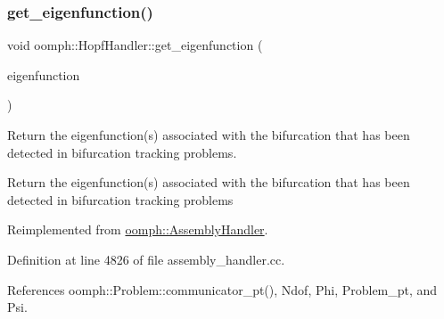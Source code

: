\mbox{\label{classoomph_1_1HopfHandler_a9d1ee586e6274cfa0baa15f82b9fa0ae}} 
\subsubsection{\texorpdfstring{get\+\_\+eigenfunction()}{get\_eigenfunction()}}
{\footnotesize\ttfamily void oomph\+::\+Hopf\+Handler\+::get\+\_\+eigenfunction (\begin{DoxyParamCaption}\item[{\hyperlink{classoomph_1_1Vector}{Vector}$<$ \hyperlink{classoomph_1_1DoubleVector}{Double\+Vector} $>$ \&}]{eigenfunction }\end{DoxyParamCaption})\hspace{0.3cm}{\ttfamily [virtual]}}



Return the eigenfunction(s) associated with the bifurcation that has been detected in bifurcation tracking problems. 

Return the eigenfunction(s) associated with the bifurcation that has been detected in bifurcation tracking problems 

Reimplemented from \hyperlink{classoomph_1_1AssemblyHandler_a6d614b1b3809d0eb7ceb393e3ae9594f}{oomph\+::\+Assembly\+Handler}.



Definition at line 4826 of file assembly\+\_\+handler.\+cc.



References oomph\+::\+Problem\+::communicator\+\_\+pt(), Ndof, Phi, Problem\+\_\+pt, and Psi.

\mbox{\label{classoomph_1_1HopfHandler_a74b0266ee15bcb294dbb946156095f8c}} 
